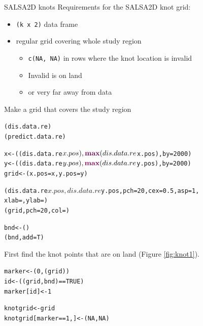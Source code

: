 \begin{block}{SALSA2D knots}
Requirements for the SALSA2D knot grid:
\begin{itemize}
\item {\tt (k x 2)} data frame
\item regular grid covering whole study region
\begin{itemize}
\item {\tt c(NA, NA)} in rows where the knot location is invalid
\item Invalid is on land 
\item or very far away from data
\end{itemize}
\end{itemize}
\end{block}

\noindent Make a grid that covers the study region
\begin{knitrout}\footnotesize
{}\color{fgcolor}\begin{kframe}
\begin{alltt}
(dis.data.re)
(predict.data.re)

x<-((dis.data.re$x.pos), \hlfunctioncall{max}(dis.data.re$x.pos), by=2000)
y<-((dis.data.re$y.pos), \hlfunctioncall{max}(dis.data.re$y.pos), by=2000)
grid<-(x.pos=x, y.pos=y)

(dis.data.re$x.pos, dis.data.re$y.pos, pch=20, cex=0.5, asp=1, 
     xlab=, ylab=)
(grid, pch=20, col=)

bnd<-() 
(bnd, add=T)
\end{alltt}
\end{kframe}
\end{knitrout}

\noindent First find the knot points that are on land (Figure \ref{fig:knot1}).

\begin{knitrout}\footnotesize
{}\color{fgcolor}\begin{kframe}
\begin{alltt}
marker<-(0, (grid))
id<-((grid, bnd)==TRUE)
marker[id]<-1

knotgrid<-grid
knotgrid[marker==1,]<-(NA,NA)
\end{alltt}
\end{kframe}
\end{knitrout}

